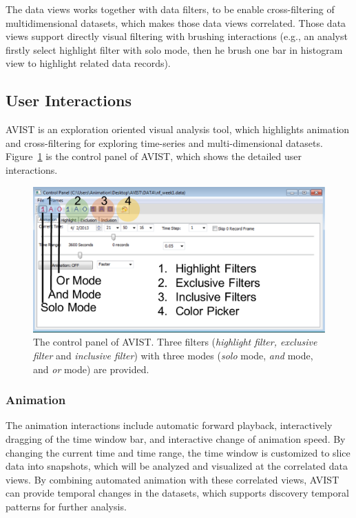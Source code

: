 The data views works together with data filters, to be enable cross-filtering of multidimensional datasets, which makes those data views correlated. Those data views support directly visual filtering with brushing interactions (e.g., an analyst firstly select highlight filter with solo mode,  then he brush one bar in histogram view to highlight related data records).


\subsection{User Interactions}
AVIST is an exploration oriented visual analysis tool, which highlights animation and cross-filtering for exploring time-series and multi-dimensional datasets. Figure~\ref{fig:control} is the control panel of AVIST,  which shows the detailed user interactions. 

\begin{figure}[htb]
	\centering
	\includegraphics[width=1.0\linewidth]{pic/control.pdf}
	\parbox[t]{1.0\columnwidth}{\relax
	}
	\caption{\label{fig:control} The control panel of AVIST. Three filters (\textit{highlight filter, exclusive filter} and \textit{inclusive filter}) with three modes (\textit{solo} mode, \textit{and} mode, and \textit{or} mode) are provided. }
\end{figure} 

	\subsubsection{Animation}
	The animation interactions include automatic forward playback, interactively dragging of the time window bar, and interactive change of animation speed. By changing the current time and time range, the time window is customized  to slice data into snapshots, which will be analyzed and visualized at the correlated data views. By combining automated animation with these correlated views, AVIST can provide temporal changes in the datasets, which supports  discovery temporal patterns for further analysis.
